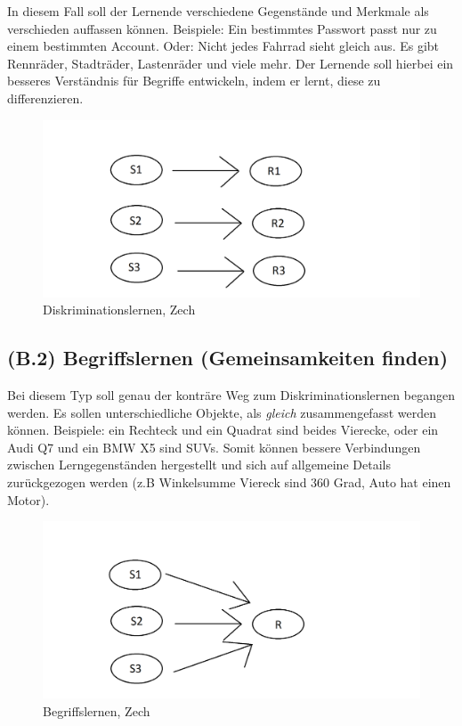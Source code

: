 In diesem Fall soll der Lernende verschiedene Gegenstände und Merkmale als verschieden auffassen können. Beispiele: Ein bestimmtes Passwort passt nur zu einem bestimmten Account. Oder: Nicht jedes Fahrrad sieht gleich aus. Es gibt Rennräder, Stadträder, Lastenräder und viele mehr. Der Lernende soll hierbei ein besseres Verständnis für Begriffe entwickeln, indem er lernt, diese zu differenzieren\cite{zech1983grundkurs}.

\begin{figure}[!ht]
\noindent\hspace{0.5mm}\includegraphics[width=12cm]{./Ressourcen/Begriffslernen.png}
\caption{Diskriminationslernen, Zech}
\end{figure}

\subsection[]{(B.2) Begriffslernen (Gemeinsamkeiten finden)}

Bei diesem Typ soll genau der konträre Weg zum Diskriminationslernen begangen werden. Es sollen unterschiedliche Objekte, als \textit{gleich} zusammengefasst werden können. 
Beispiele: ein Rechteck und ein Quadrat sind beides Vierecke, oder ein Audi Q7 und ein BMW X5 sind SUVs. Somit können bessere Verbindungen zwischen Lerngegenständen hergestellt und sich auf allgemeine Details zurückgezogen werden (z.B Winkelsumme Viereck sind 360 Grad, Auto hat einen Motor)\cite{zech1983grundkurs}.


\begin{figure}[!ht]
\noindent\hspace{0.5mm}\includegraphics[width=12cm]{./Ressourcen/Diskrimination.png}
\caption{Begriffslernen, Zech}
\end{figure}


